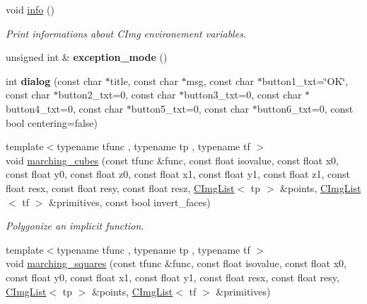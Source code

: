 \begin{DoxyCompactItemize}
\item 
void \hyperlink{namespacecimg__library_1_1cimg_aca9c244dc4cff3bc596ed8b0cd7570ee}{info} ()
\begin{DoxyCompactList}\small\item\em Print informations about C\-Img environement variables. \end{DoxyCompactList}\item 
\hypertarget{namespacecimg__library_1_1cimg_ac8ac1e757018949dcf8b82495932ba95}{unsigned int \& {\bfseries exception\-\_\-mode} ()}\label{namespacecimg__library_1_1cimg_ac8ac1e757018949dcf8b82495932ba95}

\item 
\hypertarget{namespacecimg__library_1_1cimg_aad037a737c9d825c84b0306dc691a32f}{int {\bfseries dialog} (const char $\ast$title, const char $\ast$msg, const char $\ast$button1\-\_\-txt=\char`\"{}O\-K\char`\"{}, const char $\ast$button2\-\_\-txt=0, const char $\ast$button3\-\_\-txt=0, const char $\ast$button4\-\_\-txt=0, const char $\ast$button5\-\_\-txt=0, const char $\ast$button6\-\_\-txt=0, const bool centering=false)}\label{namespacecimg__library_1_1cimg_aad037a737c9d825c84b0306dc691a32f}

\item 
\hypertarget{namespacecimg__library_1_1cimg_a8525683abfacf4175a8887da5c9a97e4}{{\footnotesize template$<$typename tfunc , typename tp , typename tf $>$ }\\void \hyperlink{namespacecimg__library_1_1cimg_a8525683abfacf4175a8887da5c9a97e4}{marching\-\_\-cubes} (const tfunc \&func, const float isovalue, const float x0, const float y0, const float z0, const float x1, const float y1, const float z1, const float resx, const float resy, const float resz, \hyperlink{structcimg__library_1_1_c_img_list}{C\-Img\-List}$<$ tp $>$ \&points, \hyperlink{structcimg__library_1_1_c_img_list}{C\-Img\-List}$<$ tf $>$ \&primitives, const bool invert\-\_\-faces)}\label{namespacecimg__library_1_1cimg_a8525683abfacf4175a8887da5c9a97e4}

\begin{DoxyCompactList}\small\item\em Polygonize an implicit function. \end{DoxyCompactList}\item 
\hypertarget{namespacecimg__library_1_1cimg_ad0cb1d5a7a211bd292d1d91719ec6828}{{\footnotesize template$<$typename tfunc , typename tp , typename tf $>$ }\\void \hyperlink{namespacecimg__library_1_1cimg_ad0cb1d5a7a211bd292d1d91719ec6828}{marching\-\_\-squares} (const tfunc \&func, const float isovalue, const float x0, const float y0, const float x1, const float y1, const float resx, const float resy, \hyperlink{structcimg__library_1_1_c_img_list}{C\-Img\-List}$<$ tp $>$ \&points, \hyperlink{structcimg__library_1_1_c_img_list}{C\-Img\-List}$<$ tf $>$ \&primitives)}\label{namespacecimg__library_1_1cimg_ad0cb1d5a7a211bd292d1d91719ec6828}


\end{DoxyCompactItemize}
